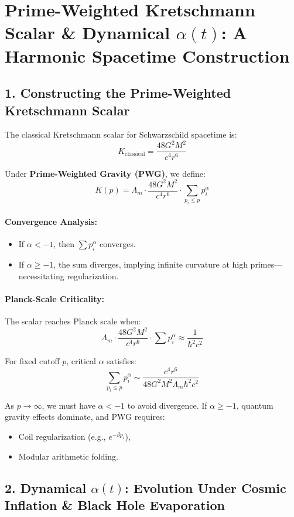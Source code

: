 \documentclass[12pt]{article}
\theoremstyle{plain}
\begin{document}
\section{Prime-Weighted Kretschmann Scalar \& Dynamical \(\alpha(t)\): A Harmonic Spacetime Construction}

\subsection*{1. Constructing the Prime-Weighted Kretschmann Scalar}

The classical Kretschmann scalar for Schwarzschild spacetime is:
\[
K_{\text{classical}} = \frac{48 G^2 M^2}{c^4 r^6}
\]

Under \textbf{Prime-Weighted Gravity (PWG)}, we define:
\[
K(p) = \Lambda_m \cdot \frac{48 G^2 M^2}{c^4 r^6} \cdot \sum_{p_i \leq p} p_i^\alpha
\]

\paragraph*{Convergence Analysis:}
\begin{itemize}
    \item If \( \alpha < -1 \), then \( \sum p_i^\alpha \) converges.
    \item If \( \alpha \geq -1 \), the sum diverges, implying infinite curvature at high primes—necessitating regularization.
\end{itemize}

\paragraph*{Planck-Scale Criticality:}
The scalar reaches Planck scale when:
\[
\Lambda_m \cdot \frac{48 G^2 M^2}{c^4 r^6} \cdot \sum p_i^\alpha \approx \frac{1}{\hbar^2 c^2}
\]

For fixed cutoff \( p \), critical \( \alpha \) satisfies:
\[
\sum_{p_i \leq p} p_i^\alpha \sim \frac{c^4 r^6}{48 G^2 M^2 \Lambda_m \hbar^2 c^2}
\]

As \( p \to \infty \), we must have \( \alpha < -1 \) to avoid divergence. If \( \alpha \geq -1 \), quantum gravity effects dominate, and PWG requires:
\begin{itemize}
    \item Coil regularization (e.g., \( e^{-\beta p_i} \)),
    \item Modular arithmetic folding.
\end{itemize}

\subsection*{2. Dynamical \(\alpha(t)\): Evolution Under Cosmic Inflation \& Black Hole Evaporation}
\end{document}

